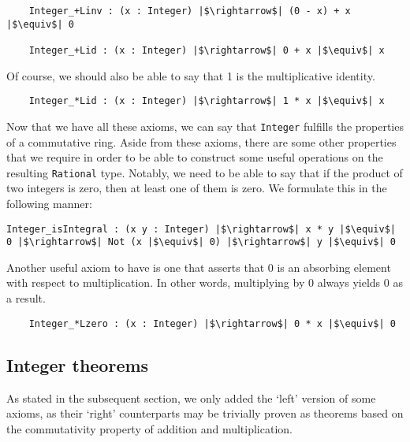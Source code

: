 \documentclass[12pt,twoside,maitrise]{dms}
\theoremstyle{definition}
\numberwithin{equation}{section}
\numberwithin{table}{chapter}
\numberwithin{figure}{chapter}
\newcommand\id[1] {\texttt{#1}}
\begin{document}
\begin{verbatim}
    Integer_+Linv : (x : Integer) |$\rightarrow$| (0 - x) + x |$\equiv$| 0

    Integer_+Lid : (x : Integer) |$\rightarrow$| 0 + x |$\equiv$| x
\end{verbatim}

Of course, we should also be able to say that 1 is the multiplicative identity.

\begin{verbatim}
    Integer_*Lid : (x : Integer) |$\rightarrow$| 1 * x |$\equiv$| x
\end{verbatim}

Now that we have all these axioms, we can say that \id{Integer} fulfills the
properties of a commutative ring. Aside from these axioms, there are some other
properties that we require in order to be able to construct some useful
operations on the resulting \id{Rational} type. Notably, we need to be able to
say that if the product of two integers is zero, then at least one of them is
zero. We formulate this in the following manner:

\begin{verbatim}
Integer_isIntegral : (x y : Integer) |$\rightarrow$| x * y |$\equiv$| 0 |$\rightarrow$| Not (x |$\equiv$| 0) |$\rightarrow$| y |$\equiv$| 0
\end{verbatim}

Another useful axiom to have is one that asserts that 0 is an absorbing element
with respect to multiplication. In other words, multiplying by 0 always yields 0
as a result.

\begin{verbatim}
    Integer_*Lzero : (x : Integer) |$\rightarrow$| 0 * x |$\equiv$| 0
\end{verbatim}

\subsection*{Integer theorems}\label{subsection:int-theorems}
As stated in the subsequent section, we only added the `left' version of some
axioms, as their `right' counterparts may be trivially proven as theorems based
on the commutativity property of addition and multiplication.
\end{document}

